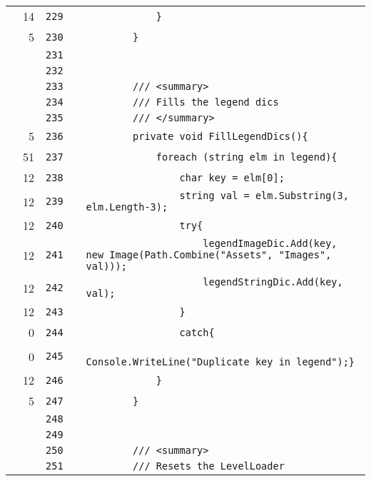 \documentclass[a4paper,landscape,10pt]{article}
\begin{document}
\begin{longtable}[l]{lrrll}
\cellcolor{green} & 14 & \verb~229~ & & \verb~            }~\\
\cellcolor{green} & 5 & \verb~230~ & & \verb~        }~\\
\cellcolor{gray} &  & \verb~231~ & & \verb~~\\
\cellcolor{gray} &  & \verb~232~ & & \verb~~\\
\cellcolor{gray} &  & \verb~233~ & & \verb~        /// <summary>~\\
\cellcolor{gray} &  & \verb~234~ & & \verb~        /// Fills the legend dics~\\
\cellcolor{gray} &  & \verb~235~ & & \verb~        /// </summary>~\\
\cellcolor{green} & 5 & \verb~236~ & & \verb~        private void FillLegendDics(){~\\
\cellcolor{green} & 51 & \verb~237~ & & \verb~            foreach (string elm in legend){~\\
\cellcolor{green} & 12 & \verb~238~ & & \verb~                char key = elm[0];~\\
\cellcolor{green} & 12 & \verb~239~ & & \verb~                string val = elm.Substring(3, elm.Length-3);~\\
\cellcolor{green} & 12 & \verb~240~ & & \verb~                try{~\\
\cellcolor{green} & 12 & \verb~241~ & & \verb~                    legendImageDic.Add(key, new Image(Path.Combine("Assets", "Images", val)));~\\
\cellcolor{green} & 12 & \verb~242~ & & \verb~                    legendStringDic.Add(key, val);~\\
\cellcolor{green} & 12 & \verb~243~ & & \verb~                }~\\
\cellcolor{red} & 0 & \verb~244~ & & \verb~                catch{~\\
\cellcolor{red} & 0 & \verb~245~ & & \verb~                    Console.WriteLine("Duplicate key in legend");}~\\
\cellcolor{green} & 12 & \verb~246~ & & \verb~            }~\\
\cellcolor{green} & 5 & \verb~247~ & & \verb~        }~\\
\cellcolor{gray} &  & \verb~248~ & & \verb~~\\
\cellcolor{gray} &  & \verb~249~ & & \verb~~\\
\cellcolor{gray} &  & \verb~250~ & & \verb~        /// <summary>~\\
\cellcolor{gray} &  & \verb~251~ & & \verb~        /// Resets the LevelLoader~\\

\end{longtable}
\end{document}
